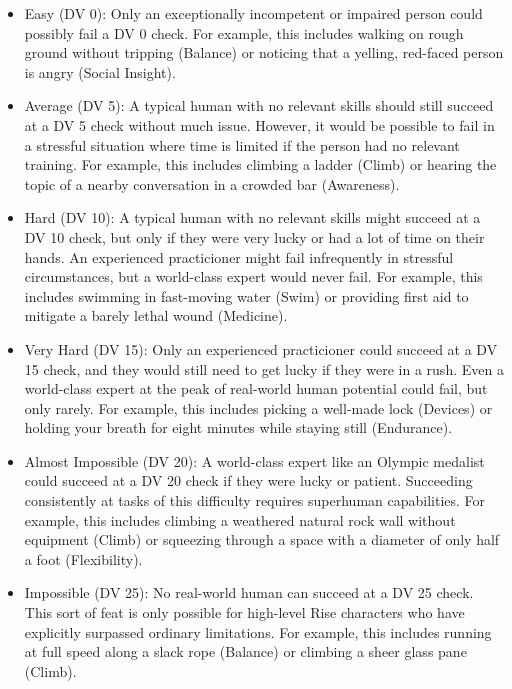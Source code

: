     \begin{itemize}
      \item Easy (DV 0): Only an exceptionally incompetent or impaired person could possibly fail a DV 0 check. For example, this includes walking on rough ground without tripping (Balance) or noticing that a yelling, red-faced person is angry (Social Insight).
      \item Average (DV 5): A typical human with no relevant skills should still succeed at a DV 5 check without much issue. However, it would be possible to fail in a stressful situation where time is limited if the person had no relevant training. For example, this includes climbing a ladder (Climb) or hearing the topic of a nearby conversation in a crowded bar (Awareness).
      \item Hard (DV 10): A typical human with no relevant skills might succeed at a DV 10 check, but only if they were very lucky or had a lot of time on their hands. An experienced practicioner might fail infrequently in stressful circumstances, but a world-class expert would never fail. For example, this includes swimming in fast-moving water (Swim) or providing first aid to mitigate a barely lethal wound (Medicine).
      \item Very Hard (DV 15): Only an experienced practicioner could succeed at a DV 15 check, and they would still need to get lucky if they were in a rush. Even a world-class expert at the peak of real-world human potential could fail, but only rarely. For example, this includes picking a well-made lock (Devices) or holding your breath for eight minutes while staying still (Endurance).
      \item Almost Impossible (DV 20): A world-class expert like an Olympic medalist could succeed at a DV 20 check if they were lucky or patient. Succeeding consistently at tasks of this difficulty requires superhuman capabilities. For example, this includes climbing a weathered natural rock wall without equipment (Climb) or squeezing through a space with a diameter of only half a foot (Flexibility).
      \item Impossible (DV 25\add): No real-world human can succeed at a DV 25 check. This sort of feat is only possible for high-level Rise characters who have explicitly surpassed ordinary limitations. For example, this includes running at full speed along a slack rope (Balance) or climbing a sheer glass pane (Climb).
    \end{itemize}


